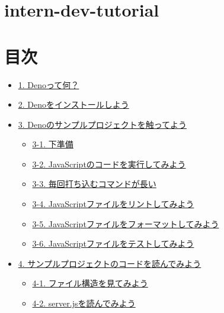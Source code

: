 \section{intern-dev-tutorial}\label{intern-dev-tutorial}

\section{目次}\label{ux76eeux6b21}

\begin{itemize}
\tightlist
\item
  \hyperref[1-denoux3063ux3066ux4f55]{1. Denoって何？}
\item
  \hyperref[2-deno-ux3092ux30a4ux30f3ux30b9ux30c8ux30fcux30ebux3057ux3088ux3046]{2.
  Denoをインストールしよう}
\item
  \hyperref[3-ux30b5ux30f3ux30d7ux30ebux30d7ux30edux30b8ux30a7ux30afux30c8ux3092ux89e6ux3063ux3066ux307fux3088ux3046]{3.
  Denoのサンプルプロジェクトを触ってよう}

  \begin{itemize}
  \tightlist
  \item
    \hyperref[3-1-ux4e0bux6e96ux5099]{3-1. 下準備}
  \item
    \hyperref[3-2-javascriptux306eux30b3ux30fcux30c9ux3092ux5b9fux884cux3057ux3066ux307fux3088ux3046]{3-2.
    JavaScriptのコードを実行してみよう}
  \item
    \hyperref[3-3-ux6bceux56deux6253ux3061ux8fbcux3080ux30b3ux30deux30f3ux30c9ux304cux9577ux3044]{3-3.
    毎回打ち込むコマンドが長い}
  \item
    \hyperref[3-4-javascriptux30d5ux30a1ux30a4ux30ebux3092ux30eaux30f3ux30c8ux3057ux3066ux307fux3088ux3046]{3-4.
    JavaScriptファイルをリントしてみよう}
  \item
    \hyperref[3-5-javascriptux30d5ux30a1ux30a4ux30ebux3092ux30d5ux30a9ux30fcux30deux30c3ux30c8ux3057ux3066ux307fux3088ux3046]{3-5.
    JavaScriptファイルをフォーマットしてみよう}
  \item
    \hyperref[3-6-javascriptux30d5ux30a1ux30a4ux30ebux3092ux30c6ux30b9ux30c8ux3057ux3066ux307fux3088ux3046]{3-6.
    JavaScriptファイルをテストしてみよう}
  \end{itemize}
\item
  \hyperref[4-ux30b5ux30f3ux30d7ux30ebux30d7ux30edux30b8ux30a7ux30afux30c8ux306eux30b3ux30fcux30c9ux3092ux8aadux3093ux3067ux307fux3088ux3046]{4.
  サンプルプロジェクトのコードを読んでみよう}

  \begin{itemize}
  \tightlist
  \item
    \hyperref[4-1-ux30d5ux30a1ux30a4ux30ebux69cbux9020ux3092ux898bux3066ux307fux3088ux3046]{4-1.
    ファイル構造を見てみよう}
  \item
    \hyperref[4-2-serverjsux3092ux8aadux3093ux3067ux307fux3088ux3046]{4-2.
    server.jsを読んでみよう}


\end{itemize}
\end{itemize}
